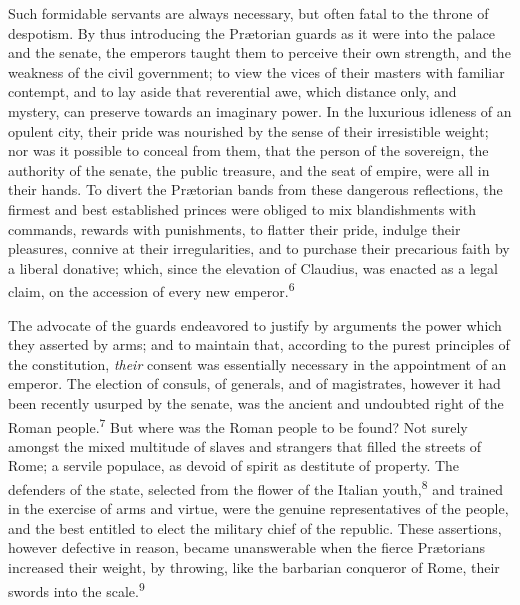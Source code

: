 Such formidable servants are always necessary, but often fatal to
the throne of despotism. By thus introducing the Prætorian guards
as it were into the palace and the senate, the emperors taught
them to perceive their own strength, and the weakness of the
civil government; to view the vices of their masters with
familiar contempt, and to lay aside that reverential awe, which
distance only, and mystery, can preserve towards an imaginary
power. In the luxurious idleness of an opulent city, their pride
was nourished by the sense of their irresistible weight; nor was
it possible to conceal from them, that the person of the
sovereign, the authority of the senate, the public treasure, and
the seat of empire, were all in their hands. To divert the
Prætorian bands from these dangerous reflections, the firmest and
best established princes were obliged to mix blandishments with
commands, rewards with punishments, to flatter their pride,
indulge their pleasures, connive at their irregularities, and to
purchase their precarious faith by a liberal donative; which,
since the elevation of Claudius, was enacted as a legal claim, on
the accession of every new emperor.\textsuperscript{6}


The advocate of the guards endeavored to justify by arguments the
power which they asserted by arms; and to maintain that,
according to the purest principles of the constitution, \textit{their}
consent was essentially necessary in the appointment of an
emperor. The election of consuls, of generals, and of
magistrates, however it had been recently usurped by the senate,
was the ancient and undoubted right of the Roman people.\textsuperscript{7} But
where was the Roman people to be found? Not surely amongst the
mixed multitude of slaves and strangers that filled the streets
of Rome; a servile populace, as devoid of spirit as destitute of
property. The defenders of the state, selected from the flower of
the Italian youth,\textsuperscript{8} and trained in the exercise of arms and
virtue, were the genuine representatives of the people, and the
best entitled to elect the military chief of the republic. These
assertions, however defective in reason, became unanswerable when
the fierce Prætorians increased their weight, by throwing, like
the barbarian conqueror of Rome, their swords into the scale.\textsuperscript{9}

